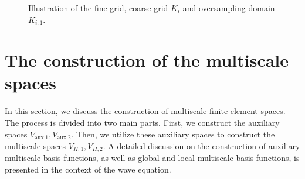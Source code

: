\documentclass[preprint,12pt]{elsarticle}
\begin{document}
\begin{figure}[htbp]
\centering
{}
\caption{Illustration of the fine grid, coarse grid $K_i$ and oversampling domain $K_{i,1}$.}
\label{fig:grid2}
\end{figure}

\section{The construction of the multiscale spaces}\label{003}
In this section, we discuss the construction of multiscale finite element spaces. The process is divided into two main parts. First, we construct the auxiliary spaces $V_{\text{aux,1}},V_{\text{aux,2}}$. Then, we utilize these auxiliary spaces to construct the multiscale spaces $V_{H,1},V_{H,2}$.  A detailed discussion on the construction of auxiliary multiscale basis functions, as well as global and local multiscale basis functions, is presented in the context of the wave equation.
\end{document}

